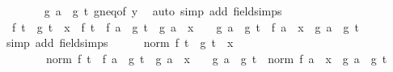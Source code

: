 \begin{isabellebody}
\ \ \ \ \ \ \isamarkupfalse%
\ {\isacartoucheopen}g\ a\ {\isacharless}{\kern0pt}\ g\ t{\isacartoucheclose}\ g{\isacharprime}{\kern0pt}{\isacharunderscore}{\kern0pt}neq{\isacharunderscore}{\kern0pt}{}{\isacharbrackleft}{\kern0pt}of\ y{\isacharbrackright}{\kern0pt}\ \isamarkupfalse%
\ {\isacharparenleft}{\kern0pt}auto\ simp\ add{\isacharcolon}{\kern0pt}\ field{\isacharunderscore}{\kern0pt}simps{\isacharparenright}{\kern0pt}\isanewline
\isanewline
\ \ \ \ \isamarkupfalse%
\ {\isacharasterisk}{\kern0pt}{\isacharcolon}{\kern0pt}\ {\isachardoublequoteopen}f\ t\ {\isacharslash}{\kern0pt}\ g\ t\ {\isacharminus}{\kern0pt}\ x\ {\isacharequal}{\kern0pt}\ {\isacharparenleft}{\kern0pt}{\isacharparenleft}{\kern0pt}f\ t\ {\isacharminus}{\kern0pt}\ f\ a{\isacharparenright}{\kern0pt}\ {\isacharslash}{\kern0pt}\ {\isacharparenleft}{\kern0pt}g\ t\ {\isacharminus}{\kern0pt}\ g\ a{\isacharparenright}{\kern0pt}\ {\isacharminus}{\kern0pt}\ x{\isacharparenright}{\kern0pt}\ {\isacharasterisk}{\kern0pt}\ {\isacharparenleft}{\kern0pt}{}\ {\isacharminus}{\kern0pt}\ g\ a\ {\isacharslash}{\kern0pt}\ g\ t{\isacharparenright}{\kern0pt}\ {\isacharplus}{\kern0pt}\ {\isacharparenleft}{\kern0pt}f\ a\ {\isacharminus}{\kern0pt}\ x\ {\isacharasterisk}{\kern0pt}\ g\ a{\isacharparenright}{\kern0pt}\ {\isacharslash}{\kern0pt}\ g\ t{\isachardoublequoteclose}\isanewline
\ \ \ \ \ \ \isamarkupfalse%
\ {\isacharparenleft}{\kern0pt}simp\ add{\isacharcolon}{\kern0pt}\ field{\isacharunderscore}{\kern0pt}simps{\isacharparenright}{\kern0pt}\isanewline
\ \ \ \ \isamarkupfalse%
\ {\isachardoublequoteopen}norm\ {\isacharparenleft}{\kern0pt}f\ t\ {\isacharslash}{\kern0pt}\ g\ t\ {\isacharminus}{\kern0pt}\ x{\isacharparenright}{\kern0pt}\ {\isasymle}\isanewline
\ \ \ \ \ \ \ \ norm\ {\isacharparenleft}{\kern0pt}{\isacharparenleft}{\kern0pt}{\isacharparenleft}{\kern0pt}f\ t\ {\isacharminus}{\kern0pt}\ f\ a{\isacharparenright}{\kern0pt}\ {\isacharslash}{\kern0pt}\ {\isacharparenleft}{\kern0pt}g\ t\ {\isacharminus}{\kern0pt}\ g\ a{\isacharparenright}{\kern0pt}\ {\isacharminus}{\kern0pt}\ x{\isacharparenright}{\kern0pt}\ {\isacharasterisk}{\kern0pt}\ {\isacharparenleft}{\kern0pt}{}\ {\isacharminus}{\kern0pt}\ g\ a\ {\isacharslash}{\kern0pt}\ g\ t{\isacharparenright}{\kern0pt}{\isacharparenright}{\kern0pt}\ {\isacharplus}{\kern0pt}\ norm\ {\isacharparenleft}{\kern0pt}{\isacharparenleft}{\kern0pt}f\ a\ {\isacharminus}{\kern0pt}\ x\ {\isacharasterisk}{\kern0pt}\ g\ a{\isacharparenright}{\kern0pt}\ {\isacharslash}{\kern0pt}\ g\ t{\isacharparenright}{\kern0pt}{\isachardoublequoteclose}\isanewline

\end{isabellebody}
